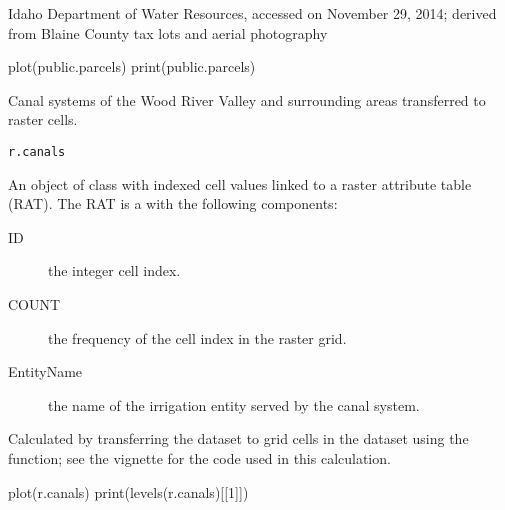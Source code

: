 \documentclass[letterpaper]{book}
\begin{document}
%
\begin{Source}\relax
Idaho Department of Water Resources, accessed on November 29, 2014;
derived from Blaine County tax lots and aerial photography
\end{Source}
%
\begin{Examples}
\begin{ExampleCode}
plot(public.parcels)
print(public.parcels)
\end{ExampleCode}
\end{Examples}
%
\begin{Description}\relax
Canal systems of the Wood River Valley and surrounding areas transferred to raster cells.
\end{Description}
%
\begin{Usage}
\begin{verbatim}
r.canals
\end{verbatim}
\end{Usage}
%
\begin{Format}
An object of  class with indexed cell values linked to a raster attribute table (RAT).
The RAT is a  with the following components:
\begin{description}

\item[ID] the integer cell index.
\item[COUNT] the frequency of the cell index in the raster grid.
\item[EntityName] the name of the irrigation entity served by the canal system.

\end{description}

\end{Format}
%
\begin{Source}\relax
Calculated by transferring the  dataset to grid cells in the  dataset using the  function;
see the  vignette for the \R{} code used in this calculation.
\end{Source}
%
\begin{Examples}
\begin{ExampleCode}
plot(r.canals)
print(levels(r.canals)[[1]])
\end{ExampleCode}
\end{Examples}
\end{document}
